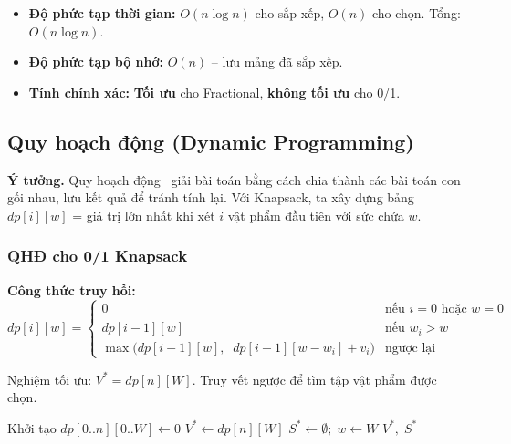 \documentclass[fontsize=13pt,a4paper]{report}
\begin{document}
\begin{itemize}[noitemsep]
    \item \textbf{Độ phức tạp thời gian:} $O(n \log n)$ cho sắp xếp, $O(n)$ cho chọn. Tổng: $O(n \log n)$.
    \item \textbf{Độ phức tạp bộ nhớ:} $O(n)$ -- lưu mảng đã sắp xếp.
    \item \textbf{Tính chính xác:} \textbf{Tối ưu} cho Fractional, \textbf{không tối ưu} cho 0/1.
\end{itemize}


\subsection{Quy hoạch động (Dynamic Programming)}

\textbf{Ý tưởng.} Quy hoạch động~\cite{bellman1957dynamic} giải bài toán bằng cách chia thành các bài toán con gối nhau, lưu kết quả để tránh tính lại. Với Knapsack, ta xây dựng bảng $dp[i][w]$ = giá trị lớn nhất khi xét $i$ vật phẩm đầu tiên với sức chứa $w$.

\subsubsection*{QHĐ cho 0/1 Knapsack}

\textbf{Công thức truy hồi:}
\begin{equation}
dp[i][w] = \begin{cases}
0 & \text{nếu } i = 0 \text{ hoặc } w = 0 \\
dp[i-1][w] & \text{nếu } w_i > w \\
\max\big(dp[i-1][w],\;\; dp[i-1][w-w_i] + v_i\big) & \text{ngược lại}
\end{cases}
\label{eq:dp01}
\end{equation}

Nghiệm tối ưu: $V^* = dp[n][W]$. Truy vết ngược để tìm tập vật phẩm được chọn.

\begin{algorithm}[H]
\caption{QHĐ cho 0/1 Knapsack}
\label{alg:dp01}
Khởi tạo $dp[0..n][0..W] \leftarrow 0$\;
$V^* \leftarrow dp[n][W]$\;
$S^* \leftarrow \emptyset;\; w \leftarrow W$\;
\Return $V^*,\; S^*$\;
\end{algorithm}
\end{document}
